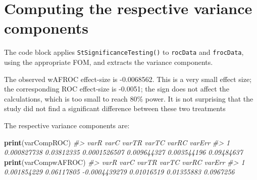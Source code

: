 \documentclass[
]{book}
\newenvironment{Shaded}{\begin{snugshade}}{\end{snugshade}}
\newcommand{\CommentTok}[1]{\textcolor[rgb]{0.56,0.35,0.01}{\textit{#1}}}
\newcommand{\DataTypeTok}[1]{\textcolor[rgb]{0.13,0.29,0.53}{#1}}
\newcommand{\KeywordTok}[1]{\textcolor[rgb]{0.13,0.29,0.53}{\textbf{#1}}}
\newcommand{\NormalTok}[1]{#1}
\newcommand{\OperatorTok}[1]{\textcolor[rgb]{0.81,0.36,0.00}{\textbf{#1}}}
\newcommand{\StringTok}[1]{\textcolor[rgb]{0.31,0.60,0.02}{#1}}
\begin{document}
\hypertarget{computing-the-respective-variance-components}{%
\section{Computing the respective variance components}\label{computing-the-respective-variance-components}}

The code block applies \texttt{StSignificanceTesting()} to \texttt{rocData} and \texttt{frocData}, using the appropriate FOM, and extracts the variance components.

\begin{Shaded}
\end{Shaded}

The observed wAFROC effect-size is -0.0068562. This is a very small effect size; the corresponding ROC effect-size is -0.0051; the sign does not affect the calculations, which is too small to reach 80\% power. It is not surprising that the study \citep{RN1882} did not find a significant difference between these two treatments

The respective variance components are:

\begin{Shaded}
\begin{Highlighting}[]
\KeywordTok{print}\NormalTok{(varCompROC)}
\CommentTok{\#\textgreater{}          varR       varC        varTR       varTC       varRC     varErr}
\CommentTok{\#\textgreater{} 1 0.000827738 0.03812335 0.0001526507 0.009644327 0.003544196 0.09484637}
\KeywordTok{print}\NormalTok{(varCompwAFROC)}
\CommentTok{\#\textgreater{}          varR       varC         varTR      varTC      varRC    varErr}
\CommentTok{\#\textgreater{} 1 0.001854229 0.06117805 {-}0.0004439279 0.01016519 0.01355883 0.0967256}
\end{Highlighting}
\end{Shaded}
\end{document}
